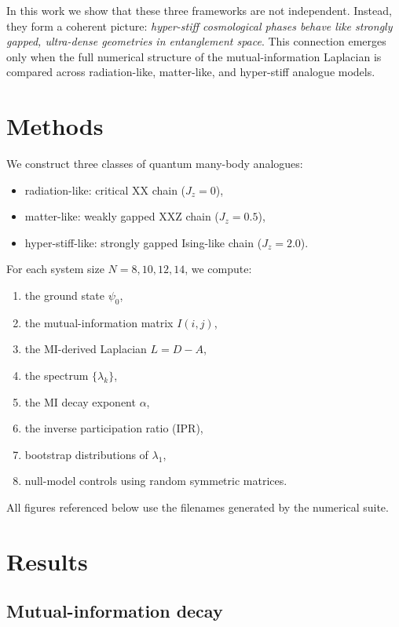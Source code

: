 \documentclass[11pt]{article}
\begin{document}
In this work we show that these three frameworks are not independent.  
Instead, they form a coherent picture: \emph{hyper-stiff cosmological phases behave like strongly gapped, ultra-dense geometries in entanglement space}. This connection emerges only when the full numerical structure of the mutual-information Laplacian is compared across radiation-like, matter-like, and hyper-stiff analogue models.

\section{Methods}

We construct three classes of quantum many-body analogues:

\begin{itemize}
    \item radiation-like: critical XX chain ($J_z = 0$),
    \item matter-like: weakly gapped XXZ chain ($J_z = 0.5$),
    \item hyper-stiff-like: strongly gapped Ising-like chain ($J_z = 2.0$).
\end{itemize}

For each system size $N = 8, 10, 12, 14$, we compute:

\begin{enumerate}
    \item the ground state $\psi_0$,
    \item the mutual-information matrix $I(i,j)$,
    \item the MI-derived Laplacian $L = D - A$,
    \item the spectrum $\{\lambda_k\}$,
    \item the MI decay exponent $\alpha$,
    \item the inverse participation ratio (IPR),
    \item bootstrap distributions of $\lambda_1$,
    \item null-model controls using random symmetric matrices.
\end{enumerate}

All figures referenced below use the filenames generated by the numerical suite.

\section{Results}

\subsection{Mutual-information decay}
\end{document}
